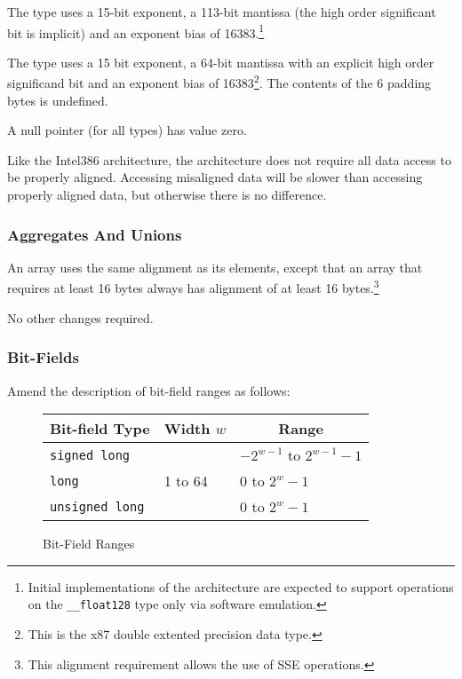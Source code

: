 The  type uses a 15-bit exponent, a 113-bit mantissa
(the high order significant bit is implicit) and an exponent bias of
16383.\footnote{Initial implementations of the \xARCH architecture are
  expected to support operations on the \texttt{__float128} type only
  via software emulation.}

The  type uses a 15 bit exponent, a 64-bit mantissa
with an explicit high order significand bit and an exponent bias of
16383\footnote{This is the x87 double extented precision data type.}.
The contents of the 6 padding bytes is undefined.

A null pointer (for all types) has value zero.

Like the Intel386 architecture, the \xARCH architecture does not
require all data access to be properly aligned.  Accessing misaligned
data will be slower than accessing properly aligned data, but
otherwise there is no difference.

\subsubsection{Aggregates And Unions}

An array uses the same alignment as its elements, except that an array
that requires at least 16 bytes always has alignment of at least 16
bytes.\footnote{This alignment requirement allows the use of SSE
  operations.}

No other changes required.

\subsubsection{Bit-Fields}

Amend the description of bit-field ranges as follows:

\begin{figure}[h]
\Hrule
  \caption{Bit-Field Ranges}
  \begin{center}
    \leavevmode
    \begin{tabular}{l|l|l}
      \multicolumn{1}{c}{Bit-field Type} 
         & \multicolumn{1}{c}{Width $w$} 
         & \multicolumn{1}{c}{Range} \\
      \hline
      \texttt{signed long} & & $-2^{w - 1}$ to $2^{w-1}-1$ \\
      \texttt{long} & 1 to 64 & 0 to $2^{w}-1$ \\
      \texttt{unsigned long} & & 0 to $2^{w}-1$ \\
    \end{tabular}
  \end{center}
\Hrule
\end{figure}

